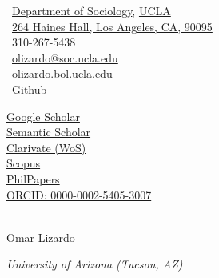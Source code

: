 \documentclass[10pt]{article}
\makeatletter
\def\myemail{olizardo@soc.ucla.edu}
\def\myweb{http://olizardo.bol.ucla.edu}
\def\myphone{310-267-5438}
\makeatother
\begin{document}
\begin{minipage}[t]{3in}
    \small
    \faUniversity \, \href{https://soc.ucla.edu}{Department of Sociology}, \href{https://ucla.edu}{UCLA} \\
    \faLocationArrow \, \href{https://goo.gl/maps/Ge1pAsh17ANWcdRB7}{264 Haines Hall, Los Angeles, CA, 90095} \\
    \faPhone \, \myphone  \\ 
    \faEnvelope \, \href{mailto:\myemail}{\myemail} \\
    \faGlobe \, \href{\myweb}{olizardo.bol.ucla.edu} \\
    \faGithub \, \href{https://github.com/olizardo}{Github}    
\end{minipage}
\hfill     
\hfill
\begin{minipage}[t]{3in}
    \flushleft
    \small 
    \href{https://scholar.google.com/citations?user=Lt5nMNkAAAAJ&hl=en}{Google Scholar} \\
    \href{https://www.semanticscholar.org/author/Omar-Lizardo/2632398}{Semantic Scholar} \\
    \href{https://www.webofscience.com/wos/author/record/477048}{Clarivate (WoS)} \\
    \href{https://www.scopus.com/authid/detail.uri?authorId=6508228764}{Scopus} \\
    \href{https://philpeople.org/profiles/omar-lizardo}{PhilPapers} \\
    \href{https://orcid.org/0000-0002-5405-3007}{ORCID: 0000-0002-5405-3007} \\
    \
\end{minipage}
\bigskip
\bigskip

\newcommand{\myname}{ \noindent}
\begin{center}
    {\myname  Omar Lizardo}
\end{center}

\reversemarginpar
\bigskip
\bigskip
\noindent\emph{University of Arizona (Tucson, AZ) \vspace{0.01in}}
\end{document}

